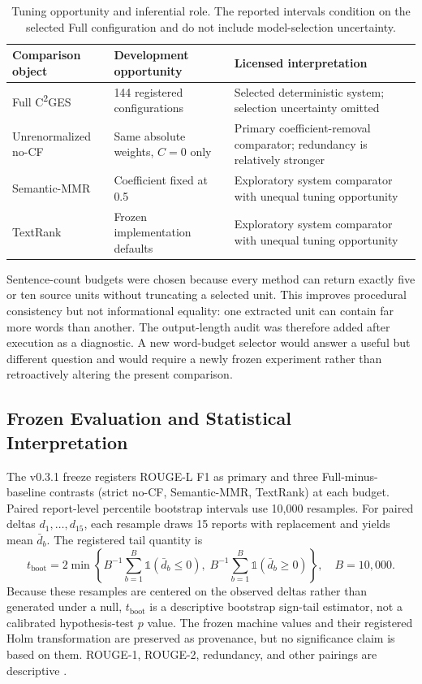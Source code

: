 \documentclass[applsci,article,submit,moreauthors]{Definitions/mdpi}
\newcommand{\cges}{C\textsuperscript{2}GES}
\begin{document}
\begin{table}[H]
\caption{Tuning opportunity and inferential role. The reported intervals condition on the selected Full configuration and do not include model-selection uncertainty.}
\label{tab:tuning-opportunity}\centering\small
\begin{tabular}{p{}p{}p{}}
\toprule
Comparison object & Development opportunity & Licensed interpretation\\
\midrule
Full \cges{} & 144 registered configurations & Selected deterministic system; selection uncertainty omitted\\
Unrenormalized no-CF & Same absolute weights, $C=0$ only & Primary coefficient-removal comparator; redundancy is relatively stronger\\
Semantic-MMR & Coefficient fixed at 0.5 & Exploratory system comparator with unequal tuning opportunity\\
TextRank & Frozen implementation defaults & Exploratory system comparator with unequal tuning opportunity\\
\bottomrule
\end{tabular}
\end{table}

Sentence-count budgets were chosen because every method can return exactly five or ten source units without truncating a selected unit. This improves procedural consistency but not informational equality: one extracted unit can contain far more words than another. The output-length audit was therefore added after execution as a diagnostic. A new word-budget selector would answer a useful but different question and would require a newly frozen experiment rather than retroactively altering the present comparison.

\subsection{Frozen Evaluation and Statistical Interpretation}

The v0.3.1 freeze registers ROUGE-L F1 as primary and three Full-minus-baseline contrasts (strict no-CF, Semantic-MMR, TextRank) at each budget. Paired report-level percentile bootstrap intervals use 10,000 resamples. For paired deltas $d_1,\ldots,d_{15}$, each resample draws 15 reports with replacement and yields mean $\bar d_b$. The registered tail quantity is
\begin{equation}
t_{\mathrm{boot}}=2\min\left\{B^{-1}\sum_{b=1}^{B}\mathbb{1}(\bar d_b\leq0),\;B^{-1}\sum_{b=1}^{B}\mathbb{1}(\bar d_b\geq0)\right\},\quad B=10{,}000.
\end{equation}
Because these resamples are centered on the observed deltas rather than generated under a null, $t_{\mathrm{boot}}$ is a descriptive bootstrap sign-tail estimator, not a calibrated hypothesis-test $p$ value. The frozen machine values and their registered Holm transformation are preserved as provenance, but no significance claim is based on them. ROUGE-1, ROUGE-2, redundancy, and other pairings are descriptive \cite{cameron2008bootstrap}.
\end{document}
